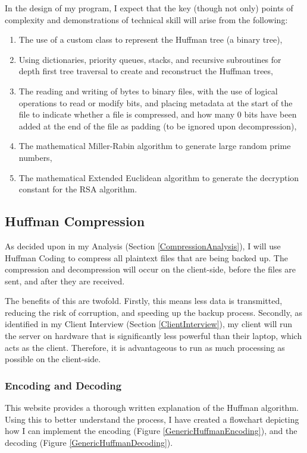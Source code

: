 \documentclass[../main.tex]{subfiles}
\begin{document}
In the design of my program, I expect that the key (though not only) points of complexity and demonstrations of technical skill will arise from the following:
\begin{enumerate}
    \item The use of a custom class to represent the Huffman tree (a binary tree),
    \item Using dictionaries, priority queues, stacks, and recursive subroutines for depth first tree traversal to create and reconstruct the Huffman trees,
    \item The reading and writing of bytes to binary files, with the use of logical operations to read or modify bits, and placing metadata at the start of the file to indicate whether a file is compressed, and how many 0 bits have been added at the end of the file as padding (to be ignored upon decompression),
    \item The mathematical Miller-Rabin algorithm to generate large random prime numbers,
    \item The mathematical Extended Euclidean algorithm to generate the decryption constant for the RSA algorithm.
\end{enumerate}

\subsection{Huffman Compression}

As decided upon in my Analysis (Section \ref{CompressionAnalysis}), I will use Huffman Coding to compress all plaintext files that are being backed up. The compression and decompression will occur on the client-side, before the files are sent, and after they are received.

The benefits of this are twofold. Firstly, this means less data is transmitted, reducing the risk of corruption, and speeding up the backup process. Secondly, as identified in my Client Interview (Section \ref{ClientInterview}), my client will run the server on hardware that is significantly less powerful than their laptop, which acts as the client. Therefore, it is advantageous to run as much processing as possible on the client-side.

\subsubsection{Encoding and Decoding}

This website \cite{PurdueHuffman} provides a thorough written explanation of the Huffman algorithm. Using this to better understand the process, I have created a flowchart depicting how I can implement the encoding (Figure \ref{GenericHuffmanEncoding}), and the decoding (Figure \ref{GenericHuffmanDecoding}).
\end{document}
